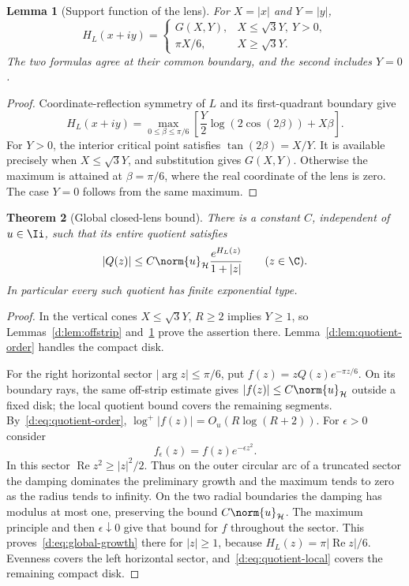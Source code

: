 \documentclass[11pt,a4paper]{article}
\numberwithin{equation}{section}
\newtheorem{theorem}{Theorem}[section]
\newtheorem{lemma}[theorem]{Lemma}
\theoremstyle{definition}\newtheorem{definition}[theorem]{Definition}
\theoremstyle{remark}\newtheorem{remark}[theorem]{Remark}
\newcommand{\Hh}{\mathcal H}\newcommand{\Hw}{\mathcal H}
\begin{document}
\begin{lemma}[Support function of the lens]\label{d:lem:lens-support}
For $X=|x|$ and $Y=|y|$,
\begin{equation}\label{d:eq:lens-support}
 H_L(x+iy)=
 \begin{cases}
 G(X,Y),&X\le\sqrt3Y,\ Y>0,\\
 \pi X/6,&X\ge\sqrt3Y.
 \end{cases}
\end{equation}
The two formulas agree at their common boundary, and the second includes $Y=0$.
\end{lemma}
\begin{proof}
Coordinate-reflection symmetry of $L$ and its first-quadrant boundary give
\[
 H_L(x+iy)=\max_{0\le\beta\le\pi/6}
 \left[\frac Y2\log(2\cos(2\beta))+X\beta\right].
\]
For $Y>0$, the interior critical point satisfies $\tan(2\beta)=X/Y$. It is available precisely when $X\le\sqrt3Y$, and substitution gives $G(X,Y)$. Otherwise the maximum is attained at $\beta=\pi/6$, where the real coordinate of the lens is zero. The case $Y=0$ follows from the same maximum.
\end{proof}

\begin{theorem}[Global closed-lens bound]\label{d:thm:global-growth}
There is a constant $C$, independent of $u\in\Ii$, such that its entire quotient satisfies
\begin{equation}\label{d:eq:global-growth}
 |Q(z)|\le C\norm{u}_{\Hh}\frac{e^{H_L(z)}}{1+|z|}
 \qquad(z\in\C).
\end{equation}
In particular every such quotient has finite exponential type.
\end{theorem}
\begin{proof}
In the vertical cones $X\le\sqrt3Y$, $R\ge2$ implies $Y\ge1$, so Lemmas~\ref{d:lem:offstrip} and~\ref{d:lem:lens-support} prove the assertion there. Lemma~\ref{d:lem:quotient-order} handles the compact disk.

For the right horizontal sector $|\arg z|\le\pi/6$, put
$f(z)=zQ(z)e^{-\pi z/6}$. On its boundary rays, the same off-strip estimate gives
$|f(z)|\le C\norm{u}_{\Hh}$ outside a fixed disk; the local quotient bound covers the remaining segments. By~\eqref{d:eq:quotient-order},
$\log^+|f(z)|=O_u(R\log(R+2))$.
For $\epsilon>0$ consider
\[
 f_\epsilon(z)=f(z)e^{-\epsilon z^2}.
\]
In this sector $\operatorname{Re}z^2\ge|z|^2/2$. Thus on the outer circular arc of a truncated sector the damping dominates the preliminary growth and the maximum tends to zero as the radius tends to infinity. On the two radial boundaries the damping has modulus at most one, preserving the bound $C\norm{u}_{\Hh}$. The maximum principle and then $\epsilon\downarrow0$ give that bound for $f$ throughout the sector. This proves~\eqref{d:eq:global-growth} there for $|z|\ge1$, because $H_L(z)=\pi|\operatorname{Re}z|/6$. Evenness covers the left horizontal sector, and~\eqref{d:eq:quotient-local} covers the remaining compact disk.
\end{proof}
\end{document}
